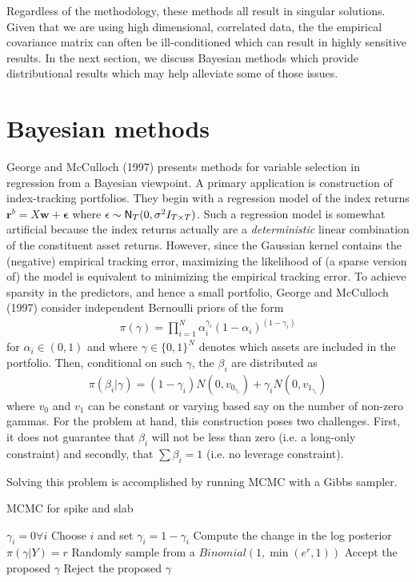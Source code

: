 \documentclass[a4paper, 12pt]{article}
\theoremstyle{plain}
\theoremstyle{definition}
\theoremstyle{remark}
\newcommand{\nm}{{\sf N}}
\begin{document}
Regardless of the methodology, these methods all result in singular solutions. Given that we are using high dimensional, correlated data, the the empirical covariance matrix can often be ill-conditioned which can result in highly sensitive results. In the next section, we discuss Bayesian methods which provide distributional results which may help alleviate some of those issues.

\section{Bayesian methods}

George and McCulloch (1997) presents methods for variable selection in regression from a Bayesian viewpoint.  A primary application is construction of index-tracking portfolios.  They begin with a regression model of the index returns
$\mathbf{r}^b = X \mathbf{w} + \mathbf{\epsilon}$
where $\mathbf{\epsilon}\sim \nm_T(0,\sigma^2I_{T\times T})$.  Such a regression model is somewhat artificial because the index returns actually are a \emph{deterministic} linear combination of the constituent asset returns.  However, since the Gaussian kernel contains the (negative) empirical tracking error, maximizing the likelihood of (a sparse version of) the model is equivalent to minimizing the empirical tracking error.  To achieve sparsity in the predictors, and hence a small portfolio, George and McCulloch (1997) consider independent Bernoulli priors of the form
\begin{align}
\pi(\gamma) = \prod_{i=1}^N\alpha_i^{\gamma_i}(1-\alpha_i)^{(1-\gamma_i)}
\end{align}
for $\alpha_i\in(0,1)$ and where $\gamma \in \{0,1\}^N$ denotes which assets are included in the portfolio. Then, conditional on such $\gamma$, the $\beta_i$ are distributed as
\begin{align}
\pi(\beta_i \vert \gamma) = (1-\gamma_i)N(0,v_{0_{\gamma_i}}) + \gamma_i N(0,v_{1_{\gamma_i}})
\end{align}
where $v_0$ and $v_1$ can be constant or varying based say on the number of non-zero gammas. For the problem at hand, this construction poses two challenges. First, it does not guarantee that $\beta_i$ will not be less than zero (i.e. a long-only constraint) and secondly, that $\sum\beta_i=1$ (i.e. no leverage constraint).

Solving this problem is accomplished by running MCMC with a Gibbs sampler.
\begin{algorithm}
\caption{MCMC for spike and slab}
\begin{algorithmic} 
\STATE $\gamma_i = 0 \forall i$
\STATE Choose $i$ and set $\gamma_i = 1-\gamma_i$
\STATE Compute the change in the log posterior $\pi(\gamma|Y)=r$ 
\STATE Randomly sample from a $Binomial(1,\min(e^{r}, 1))$
\STATE Accept the proposed $\gamma$
\ELSE
\STATE Reject the proposed $\gamma$
\ENDIF
\ENDWHILE
\end{algorithmic}
\end{algorithm}
\end{document}
